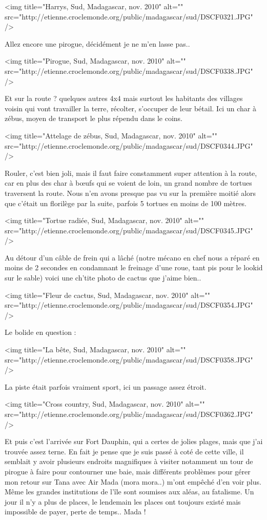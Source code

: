 <img title="Harrys, Sud, Madagascar, nov. 2010" alt="" src="http://etienne.croclemonde.org/public/madagascar/sud/DSCF0321.JPG" />

Allez encore une pirogue, décidément je ne m'en lasse pas..

<img title="Pirogue, Sud, Madagascar, nov. 2010" alt="" src="http://etienne.croclemonde.org/public/madagascar/sud/DSCF0338.JPG" />

Et sur la route ? quelques autres 4x4 mais surtout les habitants des villages voisin qui vont travailler la terre, récolter, s'occuper de leur bétail. Ici un char à zébus, moyen de transport le plus répendu dans le coins.

<img title="Attelage de zébus, Sud, Madagascar, nov. 2010" alt="" src="http://etienne.croclemonde.org/public/madagascar/sud/DSCF0344.JPG" />

Rouler, c'est bien joli, mais il faut faire constamment super attention à la route, car en plus des char à bœufs qui se voient de loin, un grand nombre de tortues traversent la route. Nous n'en avons presque pas vu sur la première moitié alors que c'était un florilège par la suite, parfois 5 tortues en moins de 100 mètres.

<img title="Tortue radiée, Sud, Madagascar, nov. 2010" alt="" src="http://etienne.croclemonde.org/public/madagascar/sud/DSCF0345.JPG" />

Au détour d'un câble de frein qui a lâché (notre mécano en chef nous a réparé en moins de 2 secondes en condamnant le freinage d'une roue, tant pis pour le lookid sur le sable) voici une ch'tite photo de cactus que j'aime bien..

<img title="Fleur de cactus, Sud, Madagascar, nov. 2010" alt="" src="http://etienne.croclemonde.org/public/madagascar/sud/DSCF0354.JPG" />

Le bolide en question :

<img title="La bête, Sud, Madagascar, nov. 2010" alt="" src="http://etienne.croclemonde.org/public/madagascar/sud/DSCF0358.JPG" />

La piste était parfois vraiment sport, ici un passage assez étroit.

<img title="Cross country, Sud, Madagascar, nov. 2010" alt="" src="http://etienne.croclemonde.org/public/madagascar/sud/DSCF0362.JPG" />

Et puis c'est l'arrivée sur Fort Dauphin, qui a certes de jolies plages, mais que j'ai trouvée assez terne. En fait je pense que je suis passé à coté de cette ville, il semblait y avoir plusieurs endroits magnifiques à visiter notamment un tour de pirogue à faire pour contourner une baie, mais différents problèmes pour gérer mon retour sur Tana avec Air Mada (mora mora..) m'ont empêché d'en voir plus. Même les grandes institutions de l'île sont soumises aux aléas, au fatalisme. Un jour il n'y a plus de places, le lendemain les places ont toujours existé mais impossible de payer, perte de temps.. Mada !

